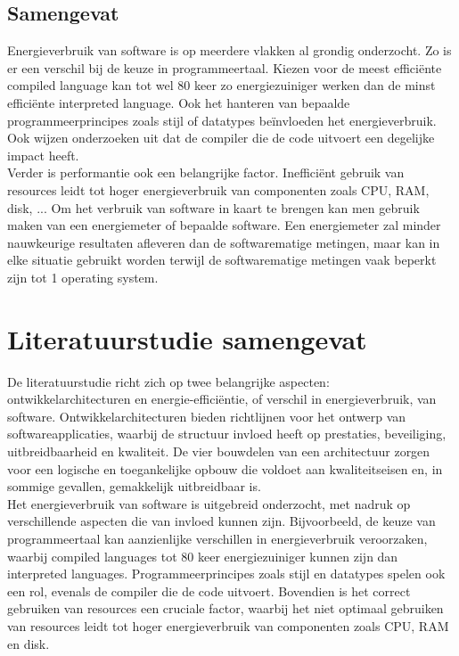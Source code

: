\subsection{Samengevat}
Energieverbruik van software is op meerdere vlakken al grondig onderzocht. Zo is er een verschil bij de keuze in programmeertaal. Kiezen voor de meest efficiënte compiled language kan tot wel 80 keer zo energiezuiniger werken dan de minst efficiënte interpreted language. Ook het hanteren van bepaalde programmeerprincipes zoals stijl of datatypes beïnvloeden het energieverbruik. Ook wijzen onderzoeken uit dat de compiler die de code uitvoert een degelijke impact heeft.\\

Verder is performantie ook een belangrijke factor. Inefficiënt gebruik van resources leidt tot hoger energieverbruik van componenten zoals CPU, RAM, disk, ... Om het verbruik van software in kaart te brengen kan men gebruik maken van een energiemeter of bepaalde software. Een energiemeter zal minder nauwkeurige resultaten afleveren dan de softwarematige metingen, maar kan in elke situatie gebruikt worden terwijl de softwarematige metingen vaak beperkt zijn tot 1 operating system. 

\section{Literatuurstudie samengevat}
De literatuurstudie richt zich op twee belangrijke aspecten: ontwikkelarchitecturen en energie-efficiëntie, of verschil in energieverbruik, van software. Ontwikkelarchitecturen bieden richtlijnen voor het ontwerp van softwareapplicaties, waarbij de structuur invloed heeft op prestaties, beveiliging, uitbreidbaarheid en kwaliteit. De vier bouwdelen van een architectuur zorgen voor een logische en toegankelijke opbouw die voldoet aan kwaliteitseisen en, in sommige gevallen, gemakkelijk uitbreidbaar is.\\

Het energieverbruik van software is uitgebreid onderzocht, met nadruk op verschillende aspecten die van invloed kunnen zijn. Bijvoorbeeld, de keuze van programmeertaal kan aanzienlijke verschillen in energieverbruik veroorzaken, waarbij compiled languages tot 80 keer energiezuiniger kunnen zijn dan interpreted languages. Programmeerprincipes zoals stijl en datatypes spelen ook een rol, evenals de compiler die de code uitvoert. Bovendien is het correct gebruiken van resources een cruciale factor, waarbij het niet optimaal gebruiken van resources leidt tot hoger energieverbruik van componenten zoals CPU, RAM en disk.\\

